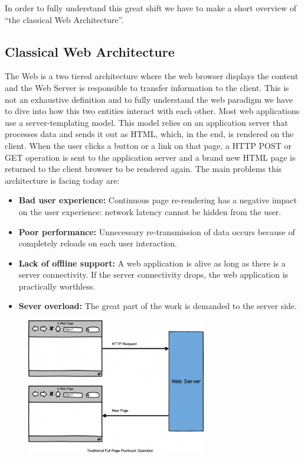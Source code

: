 \documentclass[a4paper,13pt]{report}
\begin{document}
In order to fully understand this great shift we have to make a short overview of ``the classical Web Architecture''.
\subsection{Classical Web Architecture}
The Web is a two tiered architecture where the web browser displays the content and the Web Server is responsible to transfer information to the client.
This is not an exhaustive definition and to fully understand the web paradigm we have to dive into how this two entities interact with each other.
Most web applications use a server-templating model. This model relies on an application server that processes data and sends it out as HTML, which, in the end, is rendered on the client. When the user clicks a button or a link on that page, a HTTP POST or GET operation is sent to  the application server and a brand new HTML page is returned to the client browser to be rendered again.\newline
The main problems this architecture is facing today are:
\begin{itemize}
\item \textbf{Bad user experience: } Continuous page re-rendering has a negative impact on the user experience: network latency cannot be hidden from the user.
\item \textbf{Poor performance: } Unnecessary re-transmission of data occurs because of completely reloads on each user interaction.
\item \textbf{Lack of offline support: }A web application is alive as long as there is a server connectivity. If the server connectivity drops, the web application is practically worthless.
\item \textbf{Sever overload: } The great part of the work is demanded to the server side. 
\end{itemize}

\begin{figure}[H]
  \centering
    \includegraphics[width=0.7\textwidth]{pics/architecture}
\end{figure}
\end{document}
